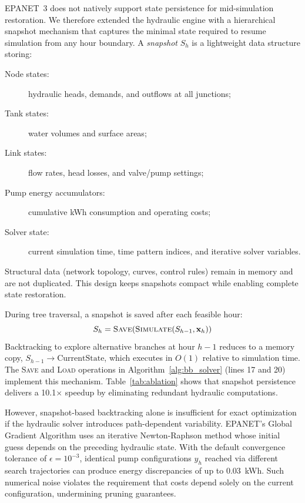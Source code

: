 \documentclass[a4paper,fleqn]{cas-dc}
\begin{document}
EPANET~3 does not natively support state persistence for mid-simulation restoration. We therefore extended the hydraulic engine with a hierarchical snapshot mechanism that captures the minimal state required to resume simulation from any hour boundary. A \emph{snapshot} $S_h$ is a lightweight data structure storing:
\begin{description}
	\item[Node states:] hydraulic heads, demands, and outflows at all junctions;
	\item[Tank states:] water volumes and surface areas;
	\item[Link states:] flow rates, head losses, and valve/pump settings;
	\item[Pump energy accumulators:] cumulative kWh consumption and operating costs;
	\item[Solver state:] current simulation time, time pattern indices, and iterative solver variables.
\end{description}
Structural data (network topology, curves, control rules) remain in memory and are not duplicated. This design keeps snapshots compact while enabling complete state restoration.

During tree traversal, a snapshot is saved after each feasible hour:
\begin{equation}
	S_h = \textsc{Save}(\textsc{Simulate}(S_{h-1}, \mathbf{x}_h))
\end{equation}
Backtracking to explore alternative branches at hour $h-1$ reduces to a memory copy, $S_{h-1} \to \text{CurrentState}$, which executes in $O(1)$ relative to simulation time. The \textsc{Save} and \textsc{Load} operations in Algorithm~\ref{alg:bb_solver} (lines 17 and 20) implement this mechanism. Table~\ref{tab:ablation} shows that snapshot persistence delivers a 10.1$\times$ speedup by eliminating redundant hydraulic computations.

However, snapshot-based backtracking alone is insufficient for exact optimization if the hydraulic solver introduces path-dependent variability. EPANET's Global Gradient Algorithm uses an iterative Newton-Raphson method whose initial guess depends on the preceding hydraulic state. With the default convergence tolerance of $\epsilon = 10^{-3}$, identical pump configurations $y_h$ reached via different search trajectories can produce energy discrepancies of up to 0.03~kWh. Such numerical noise violates the requirement that costs depend solely on the current configuration, undermining pruning guarantees.
\end{document}
